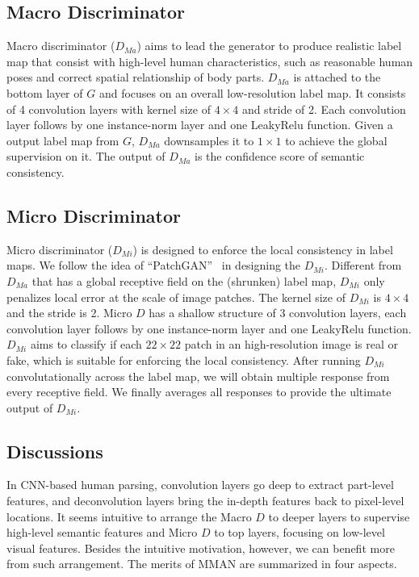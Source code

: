 \documentclass[runningheads]{llncs}
\begin{document}
\subsection{Macro Discriminator} \label{sec:ma}
Macro discriminator ($D_{Ma}$) aims to lead the generator to produce realistic label map that consist with high-level human characteristics, such as reasonable human poses and correct spatial relationship of body parts. $D_{Ma}$ is attached to the bottom layer of $G$ and focuses on an overall low-resolution label map. It consists of 4 convolution layers with kernel size of $4\times4$ and stride of 2. Each convolution layer follows by one instance-norm layer and one LeakyRelu function. Given a output label map from $G$, $D_{Ma}$ downsamples it to $1\times1$ to achieve the global supervision on it. The output of $D_{Ma}$ is the confidence score of semantic consistency.

\subsection{Micro Discriminator} \label{sec:mi}
Micro discriminator ($D_{Mi}$) is designed to enforce the local consistency in label maps. We follow the idea of ``PatchGAN''~\cite{isola2017image} in designing the $D_{Mi}$. Different from $D_{Ma}$ that has a global receptive field on the (shrunken) label map, $D_{Mi}$ only penalizes local error at the scale of image patches. The kernel size of $D_{Mi}$ is $4\times4$ and the stride is 2. Micro $D$ has a shallow structure of 3 convolution layers, each convolution layer follows by one instance-norm layer and one LeakyRelu function. $D_{Mi}$ aims to classify if each $22 \times 22$ patch in an high-resolution image is real or fake, which is suitable for enforcing the local consistency. After running $D_{Mi}$ convolutationally across the label map, we will obtain multiple response from every receptive field. We finally averages all responses to provide the ultimate output of $D_{Mi}$.

\subsection{Discussions}\label{sec:merits}
In CNN-based human parsing, convolution layers go deep to extract part-level features, and deconvolution layers bring the in-depth features back to pixel-level locations. It seems intuitive to arrange the Macro $D$ to deeper layers to supervise high-level semantic features and Micro $D$ to top layers, focusing on low-level visual features. Besides the intuitive motivation, however, we can benefit more from such arrangement. The merits of MMAN are summarized in four aspects.
\end{document}
